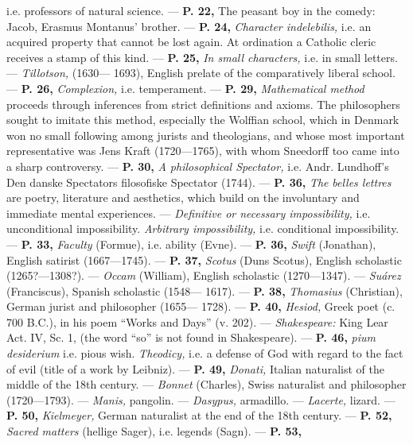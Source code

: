 \documentclass[12pt,a4paper,openany]{book}
\begin{document}
i.e. professors of natural science. --- \textbf{P. 22,} The peasant boy in
the comedy: Jacob, Erasmus Montanus' brother. --- \textbf{P. 24,} \textit{Character indelebilis,}
i.e. an acquired property that cannot be lost again. At
ordination a Catholic cleric receives a stamp of this kind. --- \textbf{P. 25,}
\textit{In small characters,} i.e. in small letters. --- \textit{Tillotson,} (1630---
1693), English prelate of the comparatively liberal school. --- \textbf{P. 26,} \textit{Complexion,}
i.e. temperament. --- \textbf{P. 29,} \textit{Mathematical method} proceeds through
inferences from strict definitions and axioms. The philosophers sought
to imitate this method, especially the Wolffian school, which in Denmark won
no small following among jurists and theologians, and whose most important representative
was Jens Kraft (1720---1765), with whom Sneedorff too came
into a sharp controversy. --- \textbf{P. 30,} \textit{A philosophical Spectator,} i.e. Andr. Lundhoff's
Den danske Spectators filosofiske Spectator (1744). --- \textbf{P. 36,} \textit{The} %
\textit{belles lettres} are poetry, literature and aesthetics, which build on the involuntary
and immediate mental experiences. --- \textit{Definitive or necessary
impossibility,} i.e. unconditional impossibility. \textit{Arbitrary impossibility,} i.e.
conditional impossibility. --- \textbf{P. 33,} \textit{Faculty} (Formue), i.e. ability (Evne). --- \textbf{P. 36,} \textit{Swift}
(Jonathan), English satirist (1667—1745). --- \textbf{P. 37,} \textit{Scotus} (Duns Scotus),
English scholastic (1265?---1308?). --- \textit{Occam} (William), English scholastic
(1270---1347). --- \textit{Suárez} (Franciscus), Spanish scholastic (1548---
1617). --- \textbf{P. 38,} \textit{Thomasius} (Christian), German jurist and philosopher (1655—
1728). --- \textbf{P. 40,} \textit{Hesiod,} Greek poet (c. 700 B.C.), in his poem ``Works
and Days'' (v. 202). --- \textit{Shakespeare:} King Lear Act. IV, Sc. 1, (the word
``so'' is not found in Shakespeare). --- \textbf{P. 46,} \textit{pium desiderium} i.e. pious
wish. \textit{Theodicy,} i.e. a defense of God with regard to the fact of evil
(title of a work by Leibniz). --- \textbf{P. 49,} \textit{Donati,} Italian
naturalist of the middle of the 18th century. --- \textit{Bonnet} (Charles), Swiss
naturalist and philosopher (1720—1793). --- \textit{Manis,} pangolin. --- \textit{Dasypus,}
armadillo. --- \textit{Lacerte,} lizard. --- \textbf{P. 50,} \textit{Kielmeyer,} German naturalist at
the end of the 18th century. --- \textbf{P. 52,} \textit{Sacred matters} (hellige Sager), i.e. legends (Sagn). --- \textbf{P. 53,}
\end{document}
